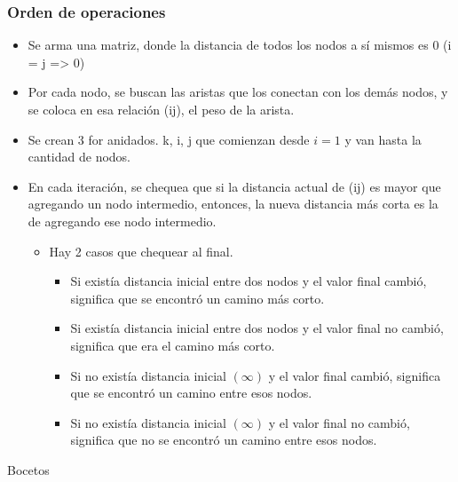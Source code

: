 \documentclass[10pt,a4paper]{article}
\begin{document}
\subsubsection*{Orden de operaciones}
\begin{itemize}
    \item Se arma una matriz, donde la distancia de todos los nodos a sí mismos es 0 (i = j => 0)
    \item Por cada nodo, se buscan las aristas que los conectan con los demás nodos, y se coloca en esa relación (ij), el peso de la arista.
    \item Se crean 3 for anidados. k, i, j que comienzan desde $i=1$ y van hasta la cantidad de nodos. 
    \item En cada iteración, se chequea que si la distancia actual de (ij) es mayor que agregando un nodo intermedio, entonces, la nueva distancia más corta es la de agregando ese nodo intermedio.
    \begin{itemize}
        \item Hay 2 casos que chequear al final.
        \begin{itemize}
            \item Si existía distancia inicial entre dos nodos y el valor final cambió, significa que se encontró un camino más corto.
            \item Si existía distancia inicial entre dos nodos y el valor final no cambió, significa que era el camino más corto.
            \item Si no existía distancia inicial $(\infty)$ y el valor final cambió, significa que se encontró un camino entre esos nodos.
            \item Si no existía distancia inicial $(\infty)$ y el valor final no cambió, significa que no se encontró un camino entre esos nodos.
        \end{itemize}
    \end{itemize}
\end{itemize}
Bocetos
\end{document}
